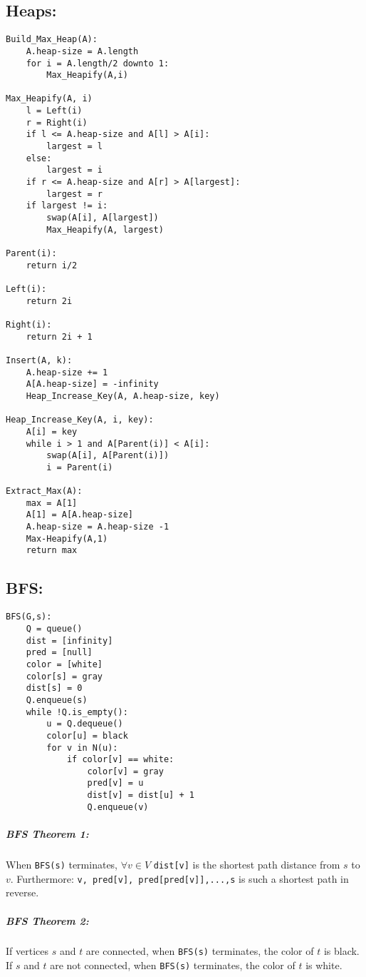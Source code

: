 \documentclass{article}
\newcommand{\code}[1]{\texttt{#1}}
\begin{document}
\subsection{Heaps:}
\begin{lstlisting}
Build_Max_Heap(A):
    A.heap-size = A.length
    for i = A.length/2 downto 1:
        Max_Heapify(A,i)

Max_Heapify(A, i)
    l = Left(i)
    r = Right(i)
    if l <= A.heap-size and A[l] > A[i]:
        largest = l
    else:
        largest = i
    if r <= A.heap-size and A[r] > A[largest]:
        largest = r
    if largest != i:
        swap(A[i], A[largest])
        Max_Heapify(A, largest)

Parent(i):
    return i/2

Left(i):
    return 2i

Right(i):
    return 2i + 1

Insert(A, k):
    A.heap-size += 1
    A[A.heap-size] = -infinity
    Heap_Increase_Key(A, A.heap-size, key)

Heap_Increase_Key(A, i, key):
    A[i] = key
    while i > 1 and A[Parent(i)] < A[i]:
        swap(A[i], A[Parent(i)])
        i = Parent(i)
    
Extract_Max(A):
    max = A[1]
    A[1] = A[A.heap-size]
    A.heap-size = A.heap-size -1
    Max-Heapify(A,1)
    return max

\end{lstlisting}
\subsection{BFS:}

\begin{lstlisting}
BFS(G,s):
    Q = queue()
    dist = [infinity]
    pred = [null]
    color = [white]
    color[s] = gray
    dist[s] = 0
    Q.enqueue(s)
    while !Q.is_empty():
        u = Q.dequeue()
        color[u] = black
        for v in N(u):
            if color[v] == white:
                color[v] = gray
                pred[v] = u
                dist[v] = dist[u] + 1
                Q.enqueue(v)
\end{lstlisting}

\subparagraph{BFS Theorem 1:} When \code{BFS(s)} terminates, \(\forall v \in V\) \code{dist[v]} is the shortest path distance from \(s\) to \(v\). Furthermore: \code{v, pred[v], pred[pred[v]],...,s} is such a shortest path in reverse.

\subparagraph{BFS Theorem 2:} If vertices \(s\) and \(t\) are connected, when \code{BFS(s)} terminates, the color of \(t\) is black. If \(s\) and \(t\) are not connected, when \code{BFS(s)} terminates, the color of \(t\) is white.
    
\end{document}
